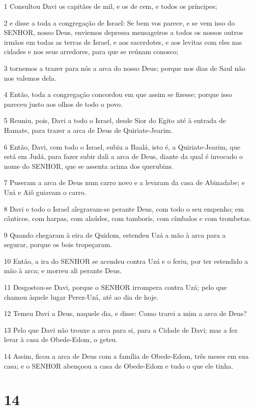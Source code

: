 \par 1 Consultou Davi os capitães de mil, e os de cem, e todos os príncipes;
\par 2 e disse a toda a congregação de Israel: Se bem vos parece, e se vem isso do SENHOR, nosso Deus, enviemos depressa mensageiros a todos os nossos outros irmãos em todas as terras de Israel, e aos sacerdotes, e aos levitas com eles nas cidades e nos seus arredores, para que se reúnam conosco;
\par 3 tornemos a trazer para nós a arca do nosso Deus; porque nos dias de Saul não nos valemos dela.
\par 4 Então, toda a congregação concordou em que assim se fizesse; porque isso pareceu justo aos olhos de todo o povo.
\par 5 Reuniu, pois, Davi a todo o Israel, desde Sior do Egito até à entrada de Hamate, para trazer a arca de Deus de Quiriate-Jearim.
\par 6 Então, Davi, com todo o Israel, subiu a Baalá, isto é, a Quiriate-Jearim, que está em Judá, para fazer subir dali a arca de Deus, diante da qual é invocado o nome do SENHOR, que se assenta acima dos querubins.
\par 7 Puseram a arca de Deus num carro novo e a levaram da casa de Abinadabe; e Uzá e Aiô guiavam o carro.
\par 8 Davi e todo o Israel alegravam-se perante Deus, com todo o seu empenho; em cânticos, com harpas, com alaúdes, com tamboris, com címbalos e com trombetas.
\par 9 Quando chegaram à eira de Quidom, estendeu Uzá a mão à arca para a segurar, porque os bois tropeçaram.
\par 10 Então, a ira do SENHOR se acendeu contra Uzá e o feriu, por ter estendido a mão à arca; e morreu ali perante Deus.
\par 11 Desgostou-se Davi, porque o SENHOR irrompera contra Uzá; pelo que chamou àquele lugar Perez-Uzá, até ao dia de hoje.
\par 12 Temeu Davi a Deus, naquele dia, e disse: Como trarei a mim a arca de Deus?
\par 13 Pelo que Davi não trouxe a arca para si, para a Cidade de Davi; mas a fez levar à casa de Obede-Edom, o geteu.
\par 14 Assim, ficou a arca de Deus com a família de Obede-Edom, três meses em sua casa; e o SENHOR abençoou a casa de Obede-Edom e tudo o que ele tinha.

\chapter{14}

